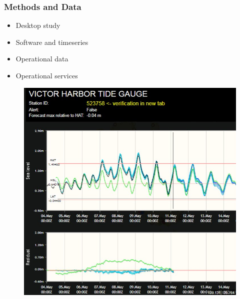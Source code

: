 \begin{frame}
\frametitle{Methods and Data}
\begin{minipage}{0.45\textwidth}
    \begin{itemize}
        \item Desktop study
        \item Software and timeseries
        \item Operational data
        \item Operational services
    \end{itemize}
\end{minipage}
\hfill
\begin{minipage}{0.45\textwidth}
    \begin{figure}      
    \includegraphics[width=\textwidth]{figures/plots/aggsealevelEgVictorHarbor.png}
    \end{figure}
\end{minipage}
\end{frame}
